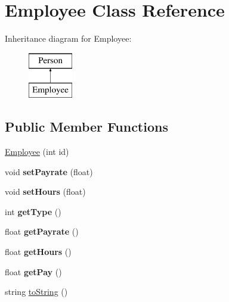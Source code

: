 \hypertarget{class_employee}{\section{Employee Class Reference}
\label{class_employee}
}
Inheritance diagram for Employee\+:\begin{figure}[H]
\begin{center}
\leavevmode
\includegraphics[height=2.000000cm]{class_employee}
\end{center}
\end{figure}
\subsection*{Public Member Functions}
\begin{DoxyCompactItemize}
\item 
\hyperlink{class_employee_a870d18c216c82139c4871ea87c3096a6}{Employee} (int id)
\item 
\hypertarget{class_employee_a69e8f49bccbea1023a0830620a394a2c}{void {\bfseries set\+Payrate} (float)}\label{class_employee_a69e8f49bccbea1023a0830620a394a2c}

\item 
\hypertarget{class_employee_aeeb769c2fdf086f0a3de58764e608913}{void {\bfseries set\+Hours} (float)}\label{class_employee_aeeb769c2fdf086f0a3de58764e608913}

\item 
\hypertarget{class_employee_a4c1a5a5dac43e63f1a80fe5b4c01dbbb}{int {\bfseries get\+Type} ()}\label{class_employee_a4c1a5a5dac43e63f1a80fe5b4c01dbbb}

\item 
\hypertarget{class_employee_a5afdea5fc7e92b5be16f0dac46e02368}{float {\bfseries get\+Payrate} ()}\label{class_employee_a5afdea5fc7e92b5be16f0dac46e02368}

\item 
\hypertarget{class_employee_a6b13934fd60774f89aab4c98b977447b}{float {\bfseries get\+Hours} ()}\label{class_employee_a6b13934fd60774f89aab4c98b977447b}

\item 
\hypertarget{class_employee_a4f05431c08f9bfa4705b3a440b703622}{float {\bfseries get\+Pay} ()}\label{class_employee_a4f05431c08f9bfa4705b3a440b703622}

\item 
string \hyperlink{class_employee_a4357aae7c7ea554889297a93cd3265e8}{to\+String} ()
\end{DoxyCompactItemize}

